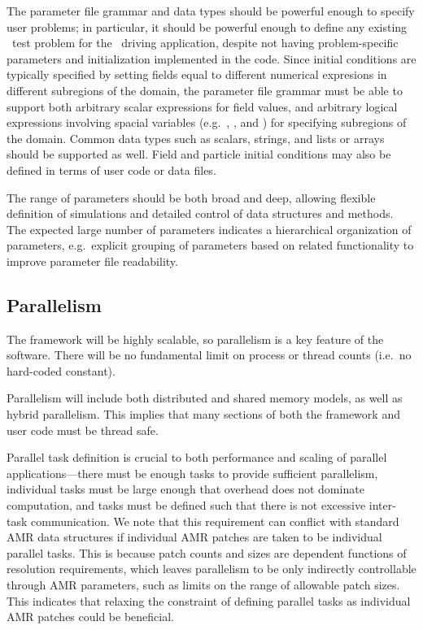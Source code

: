 \documentclass{article}
\begin{document}
The parameter file grammar and data types should be powerful enough to
specify user problems; in particular, it should be powerful enough to
define any existing \enzo\ test problem for the \enzoii\ driving
application, despite not having problem-specific parameters and
initialization implemented in the code.  Since initial conditions are
typically specified by setting fields equal to different numerical
expresions in different subregions of the domain, the parameter file
grammar must be able to support both arbitrary scalar expressions for
field values, and arbitrary logical expressions involving spacial
variables (e.g.~, , and ) for specifying
subregions of the domain.  Common data types such as scalars, strings,
and lists or arrays should be supported as well.  Field and particle
initial conditions may also be defined in terms of user code or data
files.

The range of parameters should be both broad and deep, allowing
flexible definition of simulations and detailed control of data
structures and methods.  The expected large number of parameters
indicates a hierarchical organization of parameters, e.g.~explicit
grouping of parameters based on related functionality to improve
parameter file readability.

\subsection{Parallelism}

The framework will be highly scalable, so parallelism is a key
feature of the software.  There will be no fundamental limit on
process or thread counts (i.e.~no hard-coded  constant).

Parallelism will include both distributed and shared memory models, as
well as hybrid parallelism.  This implies that many sections of both
the framework and user code must be thread safe.

Parallel task definition is crucial to both performance and scaling of
parallel applications---there must be enough tasks to provide
sufficient parallelism, individual tasks must be large enough that
overhead does not dominate computation, and tasks must be defined such
that there is not excessive inter-task communication.  We note that
this requirement can conflict with standard AMR data structures if
individual AMR patches are taken to be individual parallel tasks.
This is because patch counts and sizes are dependent functions of
resolution requirements, which leaves parallelism to be only
indirectly controllable through AMR parameters, such as limits on the
range of allowable patch sizes.  This indicates that relaxing the
constraint of defining parallel tasks as individual AMR patches could
be beneficial.
\end{document}
